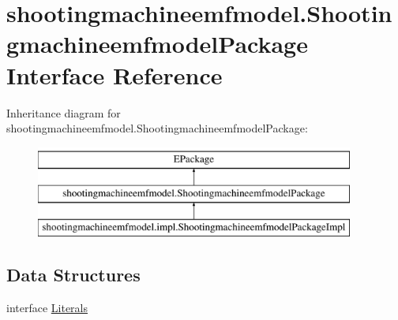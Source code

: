 \hypertarget{interfaceshootingmachineemfmodel_1_1_shootingmachineemfmodel_package}{\section{shootingmachineemfmodel.\-Shootingmachineemfmodel\-Package Interface Reference}
\label{interfaceshootingmachineemfmodel_1_1_shootingmachineemfmodel_package}
}
Inheritance diagram for shootingmachineemfmodel.\-Shootingmachineemfmodel\-Package\-:\begin{figure}[H]
\begin{center}
\leavevmode
\includegraphics[height=3.000000cm]{interfaceshootingmachineemfmodel_1_1_shootingmachineemfmodel_package}
\end{center}
\end{figure}
\subsection*{Data Structures}
\begin{DoxyCompactItemize}
\item 
interface \hyperlink{interfaceshootingmachineemfmodel_1_1_shootingmachineemfmodel_package_1_1_literals}{Literals}
\end{DoxyCompactItemize}

